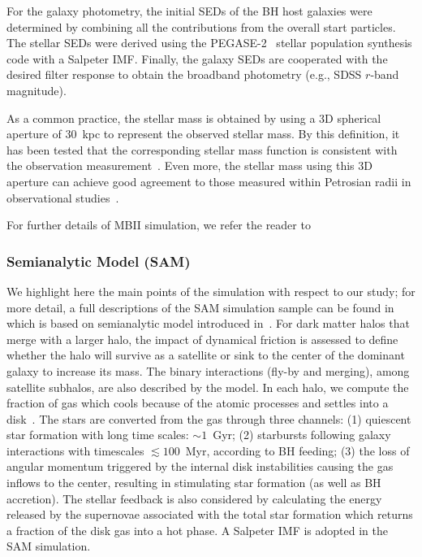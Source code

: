 \documentclass[twocolumn]{aastex631}
\begin{document}
For the galaxy photometry, the initial SEDs of the BH host galaxies were determined by combining all the contributions from the overall start particles. The stellar SEDs were derived using the PEGASE-2~\citep{1999astro.ph.12179F} stellar population synthesis code with a Salpeter IMF. Finally, the galaxy SEDs are  cooperated with the desired filter response to obtain the broadband photometry (e.g., SDSS $r$-band magnitude).

As a common practice, the stellar mass is obtained by using a 3D spherical aperture of 30~kpc to represent the observed stellar mass. By this definition, it has been tested that the corresponding stellar mass function is consistent with the observation measurement~\citep[e.g.,][]{Pillepich2018}. Even more, the stellar mass using this 3D aperture can achieve good agreement to those measured within Petrosian radii in observational studies~\citep{Schaye2015}. 

For further details of MBII simulation, we refer the reader to~\citet{Khandai2015}

\subsubsection{Semianalytic Model (SAM)}
We highlight here the main points of the simulation with respect to our study; for more detail, a full descriptions of the SAM simulation sample can be found in~\citet{Menci2016} which is based on semianalytic model introduced in~\citet{Menci2014}. For dark matter halos that merge with a larger halo, the impact of dynamical friction is assessed to define whether the halo will survive as a satellite or sink to the center of the dominant galaxy to increase its mass. The binary interactions (fly-by and merging), among satellite subhalos, are  also described by the model. In each halo, we compute the fraction of gas which cools because of the atomic processes and settles into a disk~\citep{Mo1998}. The stars are converted from the gas through three channels: (1) quiescent star formation with long time scales: $\sim1$~Gyr; (2) starbursts following galaxy interactions with timescales $\lesssim 100$~Myr, according to BH feeding; (3) the loss of angular momentum triggered by the internal disk instabilities causing the gas inflows to the center, resulting in stimulating star formation (as well as BH accretion). The stellar feedback is also considered by calculating the energy released by the supernovae associated with the total star formation which returns a fraction of the disk gas into a hot phase. A Salpeter IMF is adopted in the SAM simulation.
\end{document}
